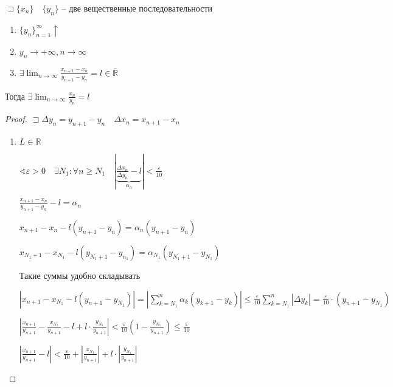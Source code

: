 \documentclass{book}
\newcommand\R{\ensuremath{\mathbb{R}}}
\newcommand{\ov}[1]{\overline{#1}}
\theoremstyle{definition}
\begin{document}
\begin{theorem}

    $\sqsupset \{x_{n}\}\quad \{y_{n} \}$ -- две вещественные последовательности 
    \begin{enumerate}
        \item $\{y_{n} \}_{n=1}^{\infty }\uparrow$
        \item $y_{n} \to +\infty , n\to \infty $
        \item $\exists \lim_{n \to \infty} \frac{x_{n+1} - x_{n} }{y_{n+1}  - y_{n} } = l\in \ov \R$
    \end{enumerate}

    Тогда $\exists \lim_{n \to \infty} \frac{x_{n} }{y_{n} } = l$
\end{theorem}
\begin{proof}
    $\sqsupset \Delta y_{n}  = y_{n+1} - y_{n} \quad \Delta x_{n}  = x_{n+1} -x_{n} $

    \begin{enumerate}
        \item $L\in \R$ 

            $\sphericalangle \varepsilon>0\quad \exists N_1: \forall n\geqslant N_1\quad \left|\underbrace{\frac{\Delta x_{n} }{\Delta y_{n} } - l}\limits_{\alpha_n}  \right| <\frac{\varepsilon}{10}$ 

            $\frac{x_{n+1} -x_{n} }{y_{n+1} - y_{n} } -l=\alpha_n $ 

            $x_{n+1} -x_{n} -l\left(y_{n+1} - y_{n}   \right)  = \alpha_n(y_{n+1} - y_{n} )$

            $x_{N_1+1}  -x_{N_1} - l\left( y_{N_1+1} - y_{n_1} \right)  = \alpha_{N_1}\left( y_{N_1+1} - y_{N_1} \right) $ 

            Такие суммы удобно складывать

            $\left| x_{n+1} - x_{N_1} - l\left( y_{n+1} - y_{N_1} \right) \right|  = \left|\sum_{k=N_1}^{n} \alpha_k\left(  y_{k+1} - y_{k} \right) \right| \leqslant \frac{\varepsilon}{10} \sum_{k=N_1}^{n} \left| \Delta y_k \right|  = \frac{\varepsilon}{10} \cdot \left( y_{n+1}  - y_{N_1} \right) $ 

            $\left| \frac{x_{n+1} }{y_{n+1}} - \frac{x_{N_1}}{y_{n+1}} - l + l\cdot \frac{y_{N_1}}{y_{n+1}} \right| <\frac{\varepsilon}{10}\left( 1-\frac{y_{N_1}}{y_{n+1}} \right) \leqslant \frac{\varepsilon}{10}$

            $\left| \frac{x_{n+1} }{y_{n+1}} - l \right| <\frac{\varepsilon}{10} + \left| \frac{x_{N_1}}{y_{n+1}} \right|  + l \cdot \left| \frac{y_{N_1}}{y_{n+1}} \right| $


\end{enumerate}
\end{proof}
\end{document}
